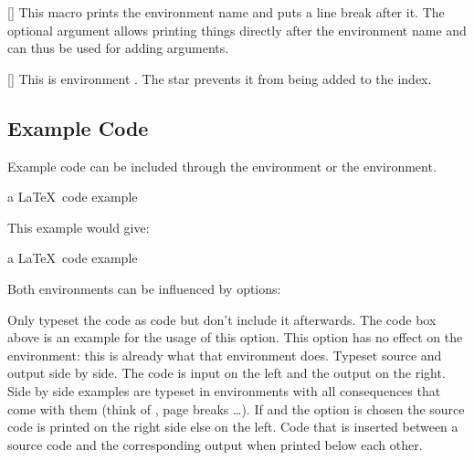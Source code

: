 \documentclass[load-preamble]{cnltx-doc}
\begin{document}
\begin{commands}
  [\sarg{}]
    This macro prints the environment name and puts a line break
    after it.  The optional argument allows printing things directly after the
    environment name and can thus be used for adding arguments.
\end{commands}

\begin{example}
  \begin{environments}
    []
      This is environment .  The star prevents it from being
      added to the index.
  \end{environments}
\end{example}

\subsection{Example Code}\label{sec:usage:examples}
Example code can be included through the  environment or the
 environment.
\begin{sourcecode}
  \begin{example}
    a \LaTeX\ code example
  \end{example}
\end{sourcecode}
This example would give:

\begin{example}
  a \LaTeX\ code example
\end{example}

Both environments can be influenced by options:
\begin{options}
    Only typeset the code as code but don't include it afterwards.  The
    code box above is an example for the usage of this option.  This option
    has no effect on the  environment: this is already what
    that environment does.
    Typeset source and output side by side.  The code is input on the left and
    the output on the right.  Side by side examples are typeset in
     environments with all consequences that come with them
    (think of , page breaks \ldots).
    If  and the option  is chosen the source
    code is printed on the right side else on the left.
    Code that is inserted between a source code and the corresponding output
    when printed below each other.
\end{options}
\end{document}
